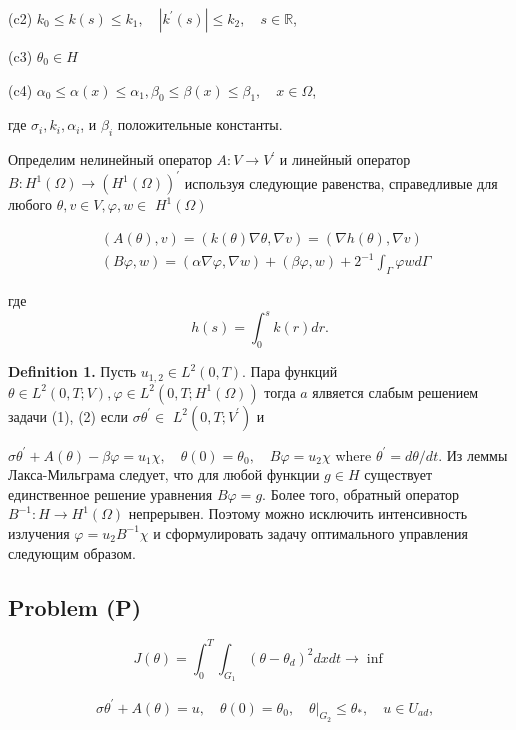 (c2) $k_{0} \leq k(s) \leq k_{1}, \quad\left|k^{\prime}(s)\right| \leq k_{2}, \quad s \in \mathbb{R}$,

(c3) $\theta_{0} \in H$

(c4) $\alpha_{0} \leq \alpha(x) \leq \alpha_{1}, \beta_{0} \leq \beta(x) \leq \beta_{1}, \quad x \in \Omega$,

где $\sigma_{i}, k_{i}, \alpha_{i}$, и $\beta_{i}$ положительные константы.

Определим нелинейный оператор $A: V \rightarrow V^{\prime}$ и линейный оператор
$B: H^{1}(\Omega) \rightarrow\left(H^{1}(\Omega)\right)^{\prime}$
используя следующие равенства, справедливые для любого
$\theta, v \in V, \varphi, w \in$ $H^{1}(\Omega)$

\[
    \begin{aligned}
        &(A(\theta), v)=(k(\theta) \nabla \theta, \nabla v)=(\nabla h(\theta), \nabla v) \\
        &(B \varphi, w)=(\alpha \nabla \varphi, \nabla w)+(\beta \varphi, w)+2^{-1}
        \int_{\Gamma} \varphi w d \Gamma
    \end{aligned}
\]

где
\[
    h(s)=\int_{0}^{s} k(r) d r.
\]

\textbf{Definition 1.} Пусть $u_{1,2} \in L^{2}(0, T)$.
Пара функций $\theta \in L^{2}(0, T ; V), \varphi \in L^{2}\left(0, T ; H^{1}(\Omega)\right)$
тогда $a$ ялвяется слабым решением задачи (1), (2)
если $\sigma \theta^{\prime} \in$ $L^{2}\left(0, T ; V^{\prime}\right)$ и

$\sigma \theta^{\prime}+A(\theta)-\beta \varphi=u_{1} \chi, \quad \theta(0)=\theta_{0},
\quad B \varphi=u_{2} \chi$ where $\theta^{\prime}=d \theta / d t$.
Из леммы Лакса-Мильграма следует, что для любой функции $g \in H$ существует единственное
решение уравнения $B \varphi=g$.
Более того, обратный оператор $B^{-1}: H \rightarrow H^{1}(\Omega)$ непрерывен.
Поэтому можно исключить интенсивность излучения $\varphi=u_{2} B^{-1} \chi$ и
сформулировать задачу оптимального управления следующим образом.

\subsection{Problem (P)}
\label{subsec:ch3:sec2:subsec3}
\[
    J(\theta)=\int_{0}^{T}
    \int_{G_{1}}\left(\theta-\theta_{d}\right)^{2} d x d t \rightarrow \inf
\]

\[
    \begin{aligned}
        & \sigma \theta^{\prime}+A(\theta)=u,
        \quad \theta(0)=\theta_{0},\left.\quad
        \theta\right|_{G_{2}} \leq \theta_{*},
        \quad u \in U_{a d},
    \end{aligned}
\]

